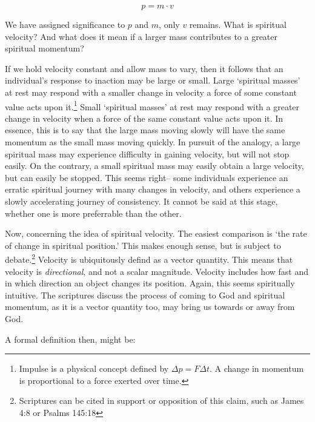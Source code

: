 \documentclass{article}
\begin{document}
                \[p = m \cdot v\]

                We have assigned significance to $p$ and $m$, only $v$ remains. What is spiritual velocity? And what does it mean if a larger mass contributes to a greater spiritual momentum?
                
                If we hold velocity constant and allow mass to vary, then it follows that an individual's response to inaction may be large or small. 
                Large `spiritual masses' at rest may respond with a smaller change in velocity a force of some constant value acts upon it.\footnote{Impulse is a physical concept defined by $\Delta p = F \Delta t$. A change in momentum is proportional to a force exerted over time.}
                Small `spiritual masses' at rest may respond with a greater change in velocity when a force of the same constant value acts upon it.
                In essence, this is to say that the large mass moving slowly will have the same momentum as the small mass moving quickly. 
                In pursuit of the analogy, a large spiritual mass may experience difficulty in gaining velocity, but will not stop easily. 
                On the contrary, a small spiritual mass may easily obtain a large velocity, but can easily be stopped. 
                This seems right-- some individuals experience an erratic spiritual journey with many changes in velocity, and others experience a slowly accelerating journey of consistency.
                It cannot be said at this stage, whether one is more preferrable than the other.

                Now, concerning the idea of spiritual velocity. The easiest comparison is `the rate of change in spiritual position.' This makes enough sense, but is subject to debate.\footnote{Scriptures can be cited in support or opposition of this claim, such as James 4:8 or Psalms 145:18}
                Velocity is ubiquitously defind as a vector quantity. This means that velocity is \emph{directional}, and not a scalar magnitude. Velocity includes how fast and in which direction an object changes its position.
                Again, this seems spiritually intuitive. The scriptures discuss the process of coming to God and spiritual momentum, as it is a vector quantity too, may bring us towards or away from God. 

                A formal definition then, might be: 
                
\end{document}
